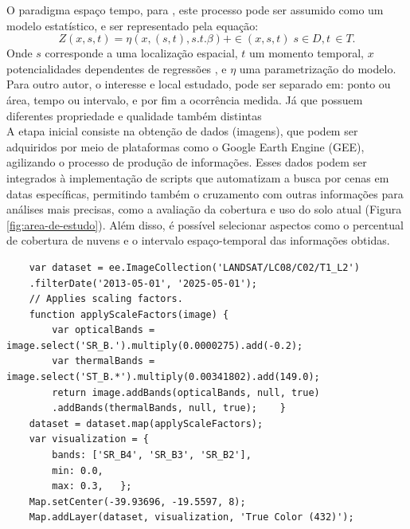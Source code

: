   \hspace*{1.25 cm} O paradigma espaço tempo, para \cite[p.2]{mateu}, este processo pode ser assumido como um modelo estatístico, e ser representado pela equação:
  \begin{equation}
  	 Z(x,s,t) =  \eta ( x,(s,t), s.t.\beta) + \in (x,s,t)  \; s \in D, t \, \in T.  
  \end{equation}
  \hspace*{1.25 cm}   Onde $s$ corresponde a uma localização espacial, $t$ um momento temporal, $x$ potencialidades  dependentes de regressões , e $ \eta $ uma parametrização do modelo.\\
   \hspace*{1.25 cm} Para outro autor,  \cite[p.151]{Bivand} o interesse e local estudado, pode ser separado em: ponto ou área, tempo ou intervalo, e por fim a ocorrência medida. Já que possuem diferentes  propriedade e qualidade também distintas  \\
  \hspace*{1.25 cm} A etapa inicial consiste na obtenção de dados (imagens), que podem ser adquiridos por meio de plataformas como o Google Earth Engine (GEE), agilizando o processo de produção de informações. Esses dados podem ser integrados à implementação de scripts que automatizam a busca por cenas em datas específicas, permitindo também o cruzamento com outras informações para análises mais precisas, como a avaliação da cobertura e uso do solo atual (Figura \ref{fig:area-de-estudo}). Além disso, é possível selecionar aspectos como o percentual de cobertura de nuvens e o intervalo espaço-temporal das informações obtidas.
  \lstset{
  	language=Java, %
  	caption=Código de obtenção de imagens multiespectrais Landsat8 plataforma Google Earth Engine Code\, em linguagem JavaScript.,} %
  
  \begin{lstlisting}
  	var dataset = ee.ImageCollection('LANDSAT/LC08/C02/T1_L2')
  	.filterDate('2013-05-01', '2025-05-01');
  	// Applies scaling factors.
  	function applyScaleFactors(image) {
  		var opticalBands = image.select('SR_B.').multiply(0.0000275).add(-0.2);
  		var thermalBands = image.select('ST_B.*').multiply(0.00341802).add(149.0);
  		return image.addBands(opticalBands, null, true)
  		.addBands(thermalBands, null, true);   	}
  	dataset = dataset.map(applyScaleFactors);
  	var visualization = {
  		bands: ['SR_B4', 'SR_B3', 'SR_B2'],
  		min: 0.0,
  		max: 0.3,  	};
  	Map.setCenter(-39.93696, -19.5597, 8);
  	Map.addLayer(dataset, visualization, 'True Color (432)');
  \end{lstlisting}
